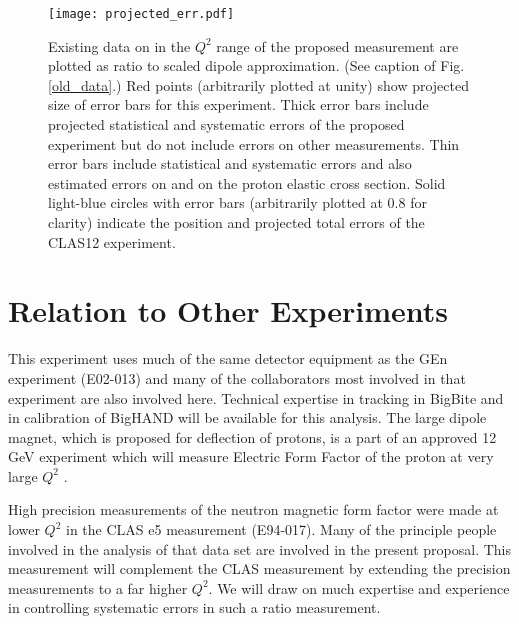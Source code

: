 \documentclass[12pt,letterpaper,oneside]{article}
\begin{document}
\begin{figure}
\texttt{[image: projected\_err.pdf]}\\
\caption{\label{projected_gmn}
Existing data on \gmn in the $Q^2$ range of the proposed measurement
are plotted as ratio to
scaled dipole approximation. (See caption of Fig. \ref{old_data}.)
Red points (arbitrarily plotted at unity) show projected size of error
bars for this experiment.  Thick error bars include projected
statistical and systematic errors of the proposed experiment but do not
include errors on other measurements.  Thin error bars include
statistical and systematic errors and also estimated errors on \gen %
and on the proton elastic cross section.  Solid light-blue circles 
with error bars
(arbitrarily plotted at 0.8 for clarity) indicate the position and
projected total errors\cite{Jerry} of the CLAS12 experiment. 
}
\end{figure}






\section{Relation to Other Experiments}

This experiment uses much of the same detector equipment as the GEn experiment
(E02-013)\cite{GEn-proposal}  and many of the 
collaborators most involved in that
experiment are also involved here.
Technical expertise in tracking in BigBite and in calibration of BigHAND 
will be available for this analysis.
The large dipole magnet, which is proposed for deflection of protons,
is a part of an approved 12 GeV experiment which will measure Electric
Form Factor of the proton at very large $Q^2$ \cite{FPP}.

High precision measurements of the neutron magnetic form factor were
made at lower $Q^2$ in the CLAS e5 measurement (E94-017).
Many of the principle people involved in the analysis \cite{Jeff} of 
that data set are involved in the present proposal.
This measurement will complement the CLAS measurement by 
extending the precision measurements to a far higher $Q^2$.  
We will draw on much expertise and experience in
controlling systematic errors in such a ratio measurement.
\end{document}
